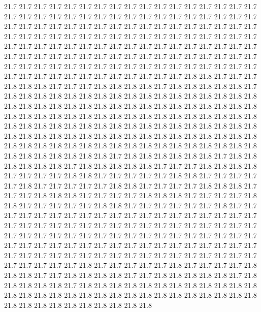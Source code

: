 21.7
21.7
21.7
21.7
21.7
21.7
21.7
21.7
21.7
21.7
21.7
21.7
21.7
21.7
21.7
21.7
21.7
21.7
21.7
21.7
21.7
21.7
21.7
21.7
21.7
21.7
21.7
21.7
21.7
21.7
21.7
21.7
21.7
21.7
21.7
21.7
21.7
21.7
21.7
21.7
21.7
21.7
21.7
21.7
21.7
21.7
21.7
21.7
21.7
21.7
21.7
21.7
21.7
21.7
21.7
21.7
21.7
21.7
21.7
21.7
21.7
21.7
21.7
21.7
21.7
21.7
21.7
21.7
21.7
21.7
21.7
21.7
21.7
21.7
21.7
21.7
21.7
21.7
21.7
21.7
21.7
21.7
21.7
21.7
21.7
21.7
21.7
21.7
21.7
21.7
21.7
21.7
21.7
21.7
21.7
21.7
21.7
21.7
21.7
21.7
21.7
21.7
21.7
21.7
21.7
21.7
21.7
21.7
21.7
21.7
21.7
21.7
21.7
21.7
21.7
21.7
21.7
21.7
21.7
21.7
21.7
21.7
21.7
21.7
21.7
21.7
21.7
21.7
21.7
21.7
21.7
21.8
21.8
21.7
21.7
21.7
21.8
21.8
21.8
21.7
21.7
21.7
21.8
21.8
21.8
21.8
21.7
21.8
21.8
21.8
21.8
21.8
21.7
21.8
21.8
21.8
21.8
21.8
21.8
21.8
21.8
21.8
21.8
21.8
21.8
21.8
21.8
21.8
21.8
21.8
21.8
21.8
21.8
21.8
21.8
21.8
21.8
21.8
21.8
21.8
21.8
21.8
21.8
21.8
21.8
21.8
21.8
21.8
21.8
21.8
21.8
21.8
21.8
21.8
21.8
21.8
21.8
21.8
21.8
21.8
21.8
21.8
21.8
21.8
21.8
21.8
21.8
21.8
21.8
21.8
21.8
21.8
21.8
21.8
21.8
21.8
21.8
21.8
21.8
21.8
21.8
21.8
21.8
21.8
21.8
21.8
21.8
21.8
21.8
21.8
21.8
21.8
21.8
21.8
21.8
21.8
21.8
21.8
21.8
21.8
21.8
21.8
21.8
21.8
21.8
21.8
21.8
21.8
21.8
21.8
21.8
21.8
21.8
21.8
21.8
21.8
21.8
21.8
21.8
21.8
21.8
21.8
21.7
21.8
21.8
21.8
21.8
21.8
21.8
21.7
21.8
21.8
21.8
21.8
21.8
21.8
21.7
21.8
21.8
21.8
21.8
21.8
21.7
21.7
21.7
21.8
21.8
21.8
21.8
21.7
21.7
21.7
21.7
21.8
21.8
21.7
21.7
21.7
21.7
21.7
21.8
21.8
21.7
21.7
21.7
21.7
21.7
21.8
21.7
21.7
21.7
21.7
21.7
21.8
21.8
21.7
21.7
21.7
21.7
21.8
21.8
21.8
21.7
21.7
21.7
21.8
21.8
21.8
21.7
21.7
21.7
21.7
21.8
21.8
21.8
21.7
21.7
21.7
21.7
21.8
21.8
21.7
21.7
21.7
21.7
21.7
21.8
21.8
21.7
21.7
21.7
21.7
21.7
21.7
21.8
21.7
21.7
21.7
21.7
21.7
21.7
21.7
21.7
21.7
21.7
21.7
21.7
21.7
21.7
21.7
21.7
21.7
21.7
21.7
21.7
21.7
21.7
21.7
21.7
21.7
21.7
21.7
21.7
21.7
21.7
21.7
21.7
21.7
21.7
21.7
21.7
21.7
21.7
21.7
21.7
21.7
21.7
21.7
21.7
21.7
21.7
21.7
21.7
21.7
21.7
21.7
21.7
21.7
21.7
21.7
21.7
21.7
21.7
21.7
21.7
21.7
21.7
21.7
21.7
21.7
21.7
21.7
21.7
21.7
21.7
21.7
21.7
21.7
21.7
21.7
21.7
21.7
21.7
21.7
21.7
21.7
21.7
21.7
21.7
21.7
21.7
21.7
21.7
21.7
21.7
21.7
21.7
21.8
21.7
21.7
21.7
21.7
21.7
21.8
21.7
21.7
21.7
21.7
21.8
21.8
21.8
21.7
21.7
21.8
21.8
21.8
21.8
21.7
21.7
21.8
21.8
21.8
21.8
21.8
21.7
21.8
21.8
21.8
21.8
21.8
21.7
21.8
21.8
21.8
21.8
21.8
21.8
21.8
21.8
21.8
21.8
21.8
21.8
21.8
21.8
21.8
21.8
21.8
21.8
21.8
21.8
21.8
21.8
21.8
21.8
21.8
21.8
21.8
21.8
21.8
21.8
21.8
21.8
21.8
21.8
21.8
21.8
21.8
21.8
21.8
